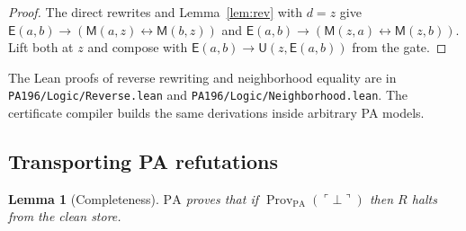 \documentclass[11pt,letterpaper]{article}
\newtheorem{lemma}[theorem]{Lemma}
\newcommand{\PA}{\mathrm{PA}}
\newcommand{\Prov}{\operatorname{Prov}}
\newcommand{\Mc}{\mathsf{M}}
\newcommand{\Uc}{\mathsf{U}}
\newcommand{\Ec}{\mathsf{E}}
\newcommand{\file}[1]{\texttt{\nolinkurl{#1}}}
\begin{document}
\begin{proof}
The direct rewrites and Lemma~\ref{lem:rev} with $d=z$ give
$\Ec(a,b)\to(\Mc(a,z)\leftrightarrow\Mc(b,z))$ and
$\Ec(a,b)\to(\Mc(z,a)\leftrightarrow\Mc(z,b))$. Lift both at $z$ and
compose with $\Ec(a,b)\to\Uc(z,\Ec(a,b))$ from the gate.
\end{proof}

The Lean proofs of reverse rewriting and neighborhood equality are
in \file{PA196/Logic/Reverse.lean} and
\file{PA196/Logic/Neighborhood.lean}. The certificate compiler builds
the same derivations inside arbitrary PA models.

\subsection{Transporting PA refutations}

\begin{lemma}[Completeness]\label{lem:complete}
$\PA$ proves that if $\Prov_{\PA}(\ulcorner\bot\urcorner)$ then $R$
halts from the clean store.
\end{lemma}
\end{document}
